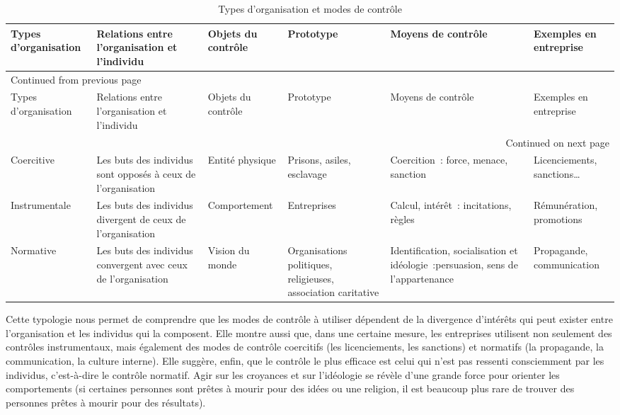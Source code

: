\documentclass{kaobook}
\begin{document}
\begin{longtable}{p{2cm} p{3cm} p{2cm} p{2cm} p{3cm} p{2cm}}
\caption{Types d'organisation et modes de contrôle}
\\
Types d'organisation & Relations entre l'organisation et l'individu & Objets du contrôle & Prototype & Moyens de contrôle & Exemples en entreprise\\
\hline
\endfirsthead
\multicolumn{6}{l}{Continued from previous page} \\
\hline

Types d'organisation & Relations entre l'organisation et l'individu & Objets du contrôle & Prototype & Moyens de contrôle & Exemples en entreprise \\

\hline
\endhead
\hline\multicolumn{6}{r}{Continued on next page} \\
\endfoot
\endlastfoot
\hline
Coercitive & Les buts des individus sont opposés à ceux de l'organisation & Entité physique & Prisons, asiles, esclavage & Coercition : force, menace, sanction & Licenciements, sanctions\ldots{}\\
Instrumentale & Les buts des individus divergent de ceux de l'organisation & Comportement & Entreprises & Calcul, intérêt :  incitations, règles & Rémunération, promotions\\
Normative & Les buts des individus convergent avec ceux de l'organisation & Vision du monde & Organisations politiques, religieuses, association caritative & Identification, socialisation et idéologie :persuasion, sens de l'appartenance & Propagande, communication\\
\end{longtable}

Cette typologie nous permet de comprendre que les modes de contrôle à utiliser dépendent de la divergence d'intérêts qui peut exister entre l'organisation et les individus qui la composent. Elle montre aussi que, dans une certaine mesure, les entreprises utilisent non seulement des contrôles instrumentaux, mais également des modes de contrôle coercitifs (les licenciements, les sanctions) et normatifs (la propagande, la communication, la culture interne). Elle suggère, enfin, que le contrôle le plus efficace est celui qui n'est pas ressenti consciemment par les individus, c'est-à-dire le contrôle normatif. Agir sur les croyances et sur l'idéologie se révèle d'une grande force pour orienter les comportements (si certaines personnes sont prêtes à mourir pour des idées ou une religion, il est beaucoup plus rare de trouver des personnes prêtes à mourir pour des résultats).\\
\end{document}
